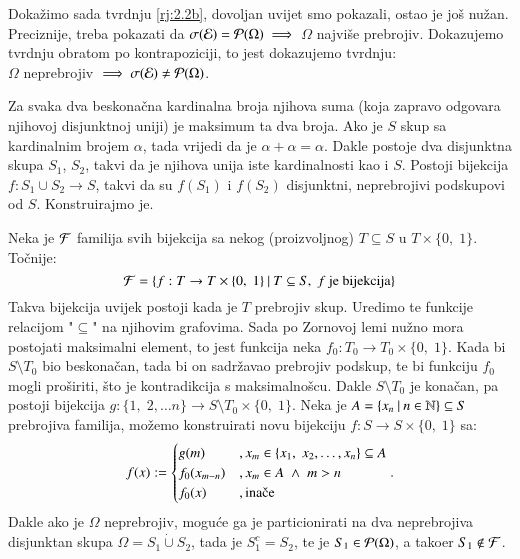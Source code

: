 \begin{rj}[\ref{zad:2.2}]
    Doka\v zimo sada tvrdnju \ref{rj:2.2b}, dovoljan uvijet smo pokazali, ostao je jo\v s nu\v zan.
    Preciznije, treba pokazati da $\sigma({\mathcal{E}}) = \mathcal{P}({\Omega}) \implies$ $\Omega$ najvi\v se prebrojiv.
    Dokazujemo tvrdnju obratom po kontrapoziciji, to jest dokazujemo tvrdnju:\\
    $\Omega$ neprebrojiv $\implies \sigma({\mathcal{E}}) \neq \mathcal{P}({\Omega})$.

    Za svaka dva beskona\v cna kardinalna broja njihova suma (koja zapravo odgovara njihovoj disjunktnoj uniji) je maksimum ta dva broja.
    Ako je $S$ skup sa kardinalnim brojem $\alpha$, tada vrijedi da je $\alpha + \alpha = \alpha$.
    Dakle postoje dva disjunktna skupa $S_1$, $S_2$, takvi da je njihova unija iste kardinalnosti kao i $S$.
    Postoji bijekcija $f: S_1 \cup S_2 \to S$, takvi da su $f(S_1)$ i $f(S_2)$ disjunktni, neprebrojivi podskupovi od $S$. Konstruirajmo je.

    Neka je $\mathcal{F}$ familija svih bijekcija sa nekog (proizvoljnog) $T \subseteq S$ u $T \times \{0, \; 1\}$.
    To\v cnije:
    \begin{equation*}
        \mathcal{F} = \{{f: T \to T \times \{0, \; 1\}} \: | \: {T \subseteq S, \; f \textnormal{ je bijekcija}}\}
    \end{equation*}
    Takva bijekcija uvijek postoji kada je $T$ prebrojiv skup.
    Uredimo te funkcije relacijom "$\subseteq$" na njihovim grafovima.
    Sada po Zornovoj lemi nu\v zno mora postojati maksimalni element, to jest funkcija neka $f_0: T_0 \to T_0 \times \{0, \; 1\}$.
    Kada bi $S \setminus T_0$ bio beskona\v can, tada bi on sadr\v zavao prebrojiv podskup, te bi funkciju $f_0$ mogli pro\v siriti, \v sto je kontradikcija s maksimalno\v scu.
    Dakle $S \setminus T_0$ je kona\v can, pa postoji bijekcija $g: \{1, \; 2, \ldots n\} \to S \setminus T_0 \times \{0, \; 1\}$.
    Neka je $A = \{{x_n} \: | \: {n \in \mathbb{N}}\} \subseteq S$ prebrojiva familija, mo\v zemo konstruirati novu bijekciju
    $f : S \to S \times \{0, \; 1\}$ sa:
    \begin{equation*}
        f(x) :=
        \begin{cases}
            g(m)    &, x_m \in \{ x_1, \; x_2, \ldots, x_n \} \subseteq A\\
            f_0(x_{m - n})  &, x_m \in A \; \land \; m > n\\
            f_0(x)  &, \textnormal{ina\v ce}
        \end{cases}.
    \end{equation*}
    Dakle ako je $\Omega$ neprebrojiv, mogu\' ce ga je particionirati na dva neprebrojiva disjunktan skupa $\Omega = S_1 \dot{\cup} S_2$, tada je $S_1^c = S_2$, te je $S_1 \in \mathcal{P}({\Omega})$, a tako\dj er $S_1 \notin \mathcal{F}$.
\end{rj}


